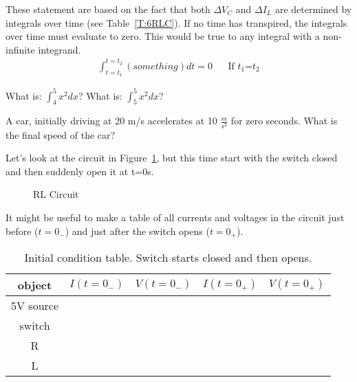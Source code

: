 These statement are based on the fact that both $\Delta V_C$ and $\Delta I_L$ are determined by integrals over time (see Table~\ref{T:6RLC}). If no time has transpired, the integrals over time must evaluate to zero. This would be true to any integral with a non-infinite integrand.\\

\begin{align}
\int_{t=t_1}^{t=t_2}(something)dt=0&&\text{If $t_1$=$t_2$}
\end{align}

\begin{blevel}
What is: $\int_{4}^{5}x^2dx$? What is: $\int_{5}^{5}x^2dx$?
\end{blevel}

\begin{blevel}
A car, initially driving at 20 m/s accelerates at 10 $\frac{m}{s^2}$ for zero seconds. What is the final speed of the car?
\end{blevel}

Let's look at the circuit in Figure~\ref{F:6RL}, but this time start with the switch closed and then suddenly open it at t=0s.

\begin{figure}[H]
\begin{center}
\caption{RL Circuit}
\label{F:6RL}
\end{center}
\end{figure}

It might be useful to make a table of all currents and voltages in the circuit just before ($t=0_{-}$) and just after the switch opens ($t=0_{+}$).

\begin{table}[H]
\begin{center}
\begin{tabular}{|c|c|c|c|c|} \hline
object	&$I(t=0_{-})$	&$V(t=0_{-})$	&$I(t=0_{+})$	&$V(t=0_{+})$ \\ \hline
5V source&&&& \\ \hline
switch&&&& \\ \hline
R&&&& \\ \hline
L&&&& \\ \hline
\end{tabular}
\caption{Initial condition table. Switch starts closed and then opens.}
\end{center}
\end{table}

